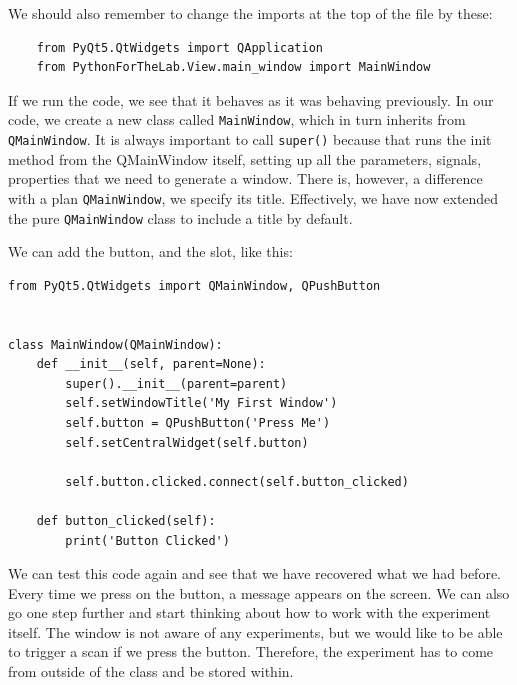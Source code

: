 We should also remember to change the imports at the top of the file by these:

\begin{verbatim}
    from PyQt5.QtWidgets import QApplication
    from PythonForTheLab.View.main_window import MainWindow
\end{verbatim}

If we run the code, we see that it behaves as it was behaving previously. In our code, we create a new class called \texttt{MainWindow}, which in turn inherits from \texttt{QMainWindow}. It is always important to call \texttt{super()} because that runs the init method from the QMainWindow itself, setting up all the parameters, signals, properties that we need to generate a window. There is, however, a difference with a plan \texttt{QMainWindow}, we specify its title. Effectively, we have now extended the pure \texttt{QMainWindow} class to include a title by default.


We can add the button, and the slot, like this:

\begin{verbatim}
from PyQt5.QtWidgets import QMainWindow, QPushButton


class MainWindow(QMainWindow):
    def __init__(self, parent=None):
        super().__init__(parent=parent)
        self.setWindowTitle('My First Window')
        self.button = QPushButton('Press Me')
        self.setCentralWidget(self.button)

        self.button.clicked.connect(self.button_clicked)

    def button_clicked(self):
        print('Button Clicked')
\end{verbatim}

We can test this code again and see that we have recovered what we had before. Every time we press on the button, a message appears on the screen. We can also go one step further and start thinking about how to work with the experiment itself. The window is not aware of any experiments, but we would like to be able to trigger a scan if we press the button. Therefore, the experiment has to come from outside of the class and be stored within.

